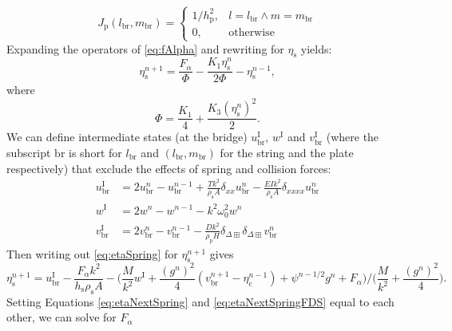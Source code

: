 \documentclass{article}
\begin{document}
\begin{equation}
J_\text{p}(l_\text{br}, m_\text{br})=
    \begin{cases}
        1/h_\text{p}^2, & l = l_\text{br} \wedge m = m_\text{br}\\
        0, & \text{otherwise}
    \end{cases}
\end{equation}
Expanding the operators of \eqref{eq:fAlpha} and rewriting for $\eta_\text{s}$ yields:
\begin{equation}\label{eq:etaNextSpring}
    \eta_\text{s}^{n+1} = \frac{F_\alpha}{\Phi}-\frac{K_1\eta_\text{s}^n}{2\Phi}-\eta_\text{s}^{n-1},
\end{equation}
where 
\begin{equation}
    \Phi = \frac{K_1}{4}+\frac{K_3(\eta_\text{s}^n)^2}{2}.
\end{equation}
We can define intermediate states (at the bridge) $u^\text{I}_\text{br}$, $w^\text{I}$ and $v^\text{I}_{\text{br}}$ (where the subscript $\text{br}$ is short for $l_\text{br}$ and $(l_\text{br},m_\text{br})$ for the string and the plate respectively) that exclude the effects of spring and collision forces:
\begin{subequations}\label{eq:intermediate}
    \begin{align}
        u^\text{I}_\text{br} &= 2u_\text{br}^n-u_\text{br}^{n-1}+\frac{Tk^2}{\rho_\text{s}A}\delta_{xx}u_\text{br}^n-\frac{EIk^2}{\rho_\text{s}A}\delta_{xxxx}u_\text{br}^n\\
        w^\text{I} &= 2w^n-w^{n-1}-k^2\omega_0^2w^n\\
        v^\text{I}_{\text{br}} &= 2v_{\text{br}}^n-v_{\text{br}}^{n-1}-\frac{Dk^2}{\rho_\text{p}H}\delta_{\Delta\boxplus}\delta_{\Delta\boxplus}v_{\text{br}}^n
    \end{align}
\end{subequations}
Then writing out \eqref{eq:etaSpring} for $\eta_\text{s}^{n+1}$ gives
\begin{equation}\label{eq:etaNextSpringFDS}
    \eta_\text{s}^{n+1} =u^\text{I}_\text{br}-\frac{F_\alpha k^2}{h_\text{s}\rho_\text{s}A}-\bigg(\frac{M}{k^2}w^\text{I}+\frac{(g^n)^2}{4}(v_{\text{br}}^{n+1}-\eta_\text{c}^{n-1}) + \psi^{n-1/2}g^n + F_\alpha\bigg)/ \bigg(\frac{M}{k^2}+\frac{(g^n)^2}{4}\bigg).
\end{equation}
Setting Equations \eqref{eq:etaNextSpring} and \eqref{eq:etaNextSpringFDS} equal to each other, we can solve for $F_\alpha$
\end{document}
